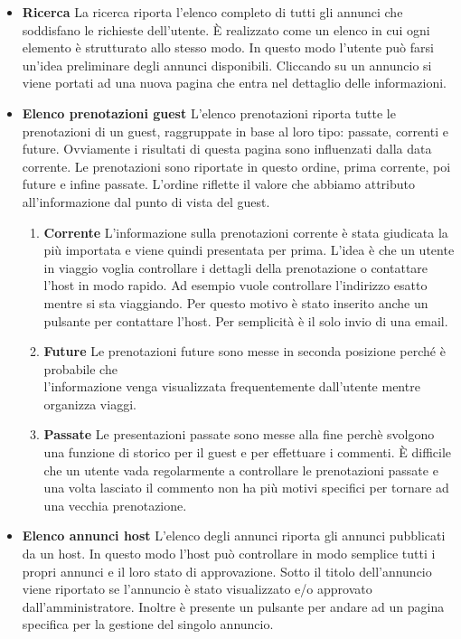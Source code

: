 \documentclass[1_relazione.tex]{subfiles}
\begin{document}
    \begin{itemize}
        \item \textbf{Ricerca}
        La ricerca riporta l'elenco completo di tutti gli annunci che soddisfano le richieste dell'utente. \`{E} realizzato come un elenco in cui ogni elemento \`{e} strutturato allo stesso modo. In questo modo l'utente pu\`{o} farsi un'idea preliminare degli annunci disponibili. Cliccando su un annuncio si viene portati ad una nuova pagina che entra nel dettaglio delle informazioni.

        \item\textbf{Elenco prenotazioni guest}
        L'elenco prenotazioni riporta tutte le prenotazioni di un guest, raggruppate in base al loro tipo: passate, correnti e future. Ovviamente i risultati di questa pagina sono influenzati dalla data corrente. Le prenotazioni sono riportate in questo ordine, prima corrente, poi future e infine passate. L'ordine riflette il valore che abbiamo attributo all'informazione dal punto di vista del guest.
        \begin{enumerate}
            \item \textbf{Corrente} L'informazione sulla prenotazioni corrente \`{e} stata giudicata la pi\`{u} importata e viene quindi presentata per prima. L'idea \`{e} che un utente in viaggio voglia controllare i dettagli della prenotazione o contattare l'host in modo rapido. Ad esempio vuole controllare l'indirizzo esatto mentre si sta viaggiando. Per questo motivo \`{e} stato inserito anche un pulsante per contattare l'host. Per semplicit\`{a} \`{e} il solo invio di una email.
            \item \textbf{Future} Le prenotazioni future sono messe in seconda posizione perch\'{e} \`{e} probabile che \\l'informazione venga visualizzata frequentemente dall'utente mentre organizza viaggi.
            \item \textbf{Passate} Le presentazioni passate sono messe alla fine perch\`{e} svolgono una funzione di storico per il guest e per effettuare i commenti. \`{E} difficile che un utente vada regolarmente a controllare le prenotazioni passate e una volta lasciato il commento non ha pi\`{u} motivi specifici per tornare ad una vecchia prenotazione.
        \end{enumerate}

        \item \textbf{Elenco annunci host}
        L'elenco degli annunci riporta gli annunci pubblicati da un host. In questo modo l'host pu\`{o} controllare in modo semplice tutti i propri annunci e il loro stato di approvazione. Sotto il titolo dell'annuncio viene riportato se l'annuncio \`{e} stato visualizzato e/o approvato dall'amministratore. Inoltre \`{e} presente un pulsante per andare ad un pagina specifica per la gestione del singolo annuncio.


\end{itemize}
\end{document}
